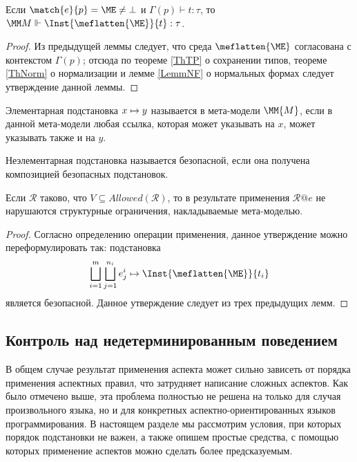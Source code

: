 \begin{Lemm}
Если $\match{e}{p} = \ME \neq \bot$ и $\Gamma(p) \vdash t : \tau$, то $\fromMM \Inst{\meflatten{\ME}}{t} : \tau$.
\end{Lemm}
\begin{proof}
Из предыдущей леммы следует, что среда $\meflatten{\ME}$ согласована с контекстом $\Gamma(p)$; отсюда по теореме \ref{ThTP} о сохранении типов, теореме \ref{ThNorm} о нормализации и лемме \ref{LemmNF} о нормальных формах следует утверждение данной леммы.
\end{proof}

\begin{Def}
Элементарная подстановка $x \mapsto y$ называется  в мета-модели $\MM{M}$, если в данной мета-модели любая ссылка, которая может указывать на $x$, может указывать также и на $y$.

Неэлементарная подстановка называется безопасной, если она получена композицией безопасных подстановок.
\end{Def}

\begin{Th}
Если $\mathcal{R}$ таково, что $V \subseteq Allowed(\mathcal{R})$, то в результате применения $\mathcal{R}@e$ не нарушаются структурные ограничения, накладываемые мета-моделью.
\end{Th}
\begin{proof}
Согласно определению операции применения, данное утверждение можно переформулировать так: подстановка
$$
\bigsqcup\limits_{i=1}^{m} \bigsqcup\limits_{j=1}^{n_i}
			\subst{e^i_j}{\Inst{\meflatten{\ME}}{t_i}}
$$
является безопасной. Данное утверждение следует из трех предыдущих лемм.
\end{proof}

\subsection{Контроль над недетерминированным поведением}

В общем случае результат применения аспекта может сильно зависеть от порядка применения аспектных правил, что затрудняет написание сложных аспектов. Как было отмечено выше, эта проблема полностью не решена на только для случая произвольного языка, но и для конкретных аспектно-ориентированных языков программирования. В настоящем разделе мы рассмотрим условия, при которых порядок подстановки не важен, а также опишем простые средства, с помощью которых применение аспектов можно сделать более предсказуемым.

